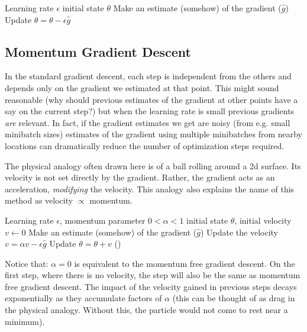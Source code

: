\documentclass{article}
\begin{document}
\begin{algorithm}
\begin{algorithmic}
    \Require{} Learning rate $\epsilon$
    \Require{} initial state $\theta$
    \While{---}
        \State{} Make an estimate (somehow) of the gradient ($\hat{g}$)
        \State{} Update $\theta = \theta - \epsilon \hat{g}$
    \EndWhile{}
\end{algorithmic}
\end{algorithm}

\subsection{Momentum Gradient Descent}

In the standard gradient descent, each step is independent from the others and depends only on the gradient we estimated at that point. This might sound reasonable (why should previous estimates of the gradient at other points have a say on the current step?) but when the learning rate is small previous gradients {\em are\/} relevant. In fact, if the gradient estimates we get are noisy (from e.g. small minibatch sizes) estimates of the gradient using multiple minibatches from nearby locations can dramatically reduce the number of optimization steps required.

The physical analogy often drawn here is of a ball rolling around a 2d surface. Its velocity is not set directly by the gradient. Rather, the gradient acts as an acceleration, {\em modifying\/} the velocity. This analogy also explains the name of this method as velocity $\propto$ momentum.

\begin{algorithm}
\begin{algorithmic}
    \Require{} Learning rate $\epsilon$, momentum parameter $0 < \alpha < 1$
    \Require{} initial state $\theta$, initial velocity $v \gets 0$
    \While{---}
        \State{} Make an estimate (somehow) of the gradient ($\hat{g}$)
        \State{} Update the velocity $v = \alpha v - \epsilon \hat{g}$
        \State{} Update $\theta = \theta + v$
    \EndWhile()
\end{algorithmic}
\end{algorithm}

Notice that: $\alpha = 0$ is equivalent to the momentum free gradient descent. On the first step, where there is no velocity, the step will also be the same as momentum free gradient descent. The impact of the velocity gained in previous steps decays exponentially as they accumulate factors of $\alpha$ (this can be thought of as drag in the physical analogy. Without this, the particle would not come to rest near a minimum).
\end{document}
